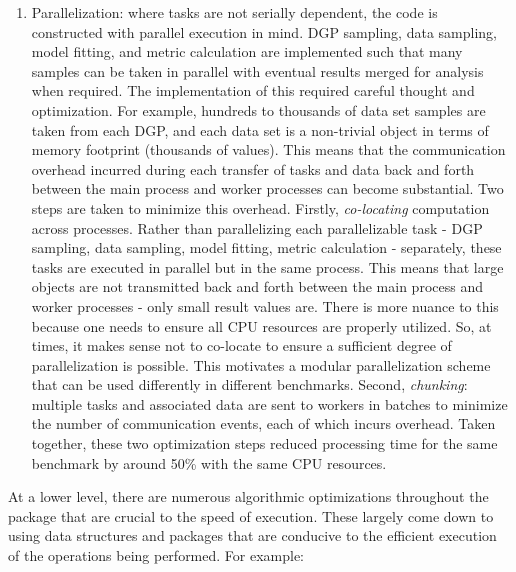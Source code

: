 \documentclass[./main.tex]{subfiles}
\begin{document}
\begin{enumerate}
    \item Parallelization: where tasks are not serially dependent, the code is constructed with parallel execution in mind. DGP sampling, data sampling, model fitting, and metric calculation are implemented such that many samples can be taken in parallel with eventual results merged for analysis when required. The implementation of this required careful thought and optimization. For example, hundreds to thousands of data set samples are taken from each DGP, and each data set is a non-trivial object in terms of memory footprint (thousands of values). This means that the communication overhead incurred during each transfer of tasks and data back and forth between the main process and worker processes can become substantial. Two steps are taken to minimize this overhead. Firstly, \textit{co-locating} computation across processes. Rather than parallelizing each parallelizable task - DGP sampling, data sampling, model fitting, metric calculation - separately, these tasks are executed in parallel but in the same process. This means that large objects are not transmitted back and forth between the main process and worker processes - only small result values are. There is more nuance to this because one needs to ensure all CPU resources are properly utilized. So, at times, it makes sense not to co-locate to ensure a sufficient degree of parallelization is possible. This motivates a modular parallelization scheme that can be used differently in different benchmarks. Second, \textit{chunking}: multiple tasks and associated data are sent to workers in batches to minimize the number of communication events, each of which incurs overhead. Taken together, these two optimization steps reduced processing time for the same benchmark by around 50\% with the same CPU resources.
\end{enumerate}
 
At a lower level, there are numerous algorithmic optimizations throughout the package that are crucial to the speed of execution. These largely come down to using data structures and packages that are conducive to the efficient execution of the operations being performed. For example:
\end{document}
